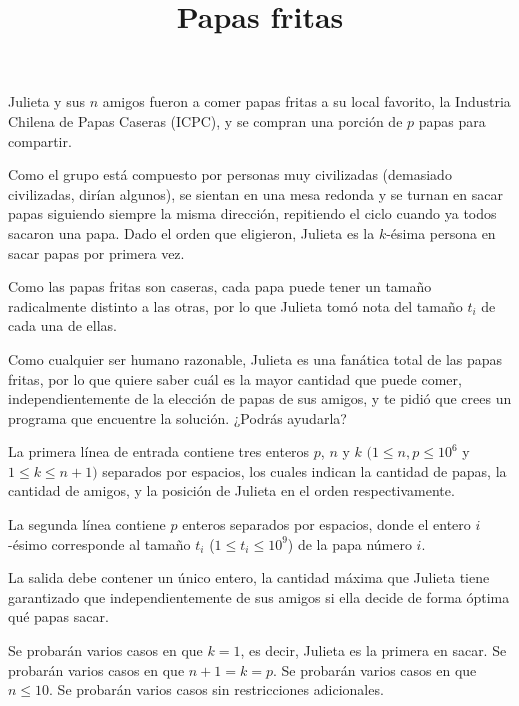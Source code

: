 \documentclass{oci}
\title{Papas fritas}
\begin{document}
\begin{problemDescription}
	Julieta y sus $n$ amigos fueron a comer papas fritas a su local favorito, la Industria Chilena de Papas Caseras (ICPC), y se compran una porción de $p$ papas para compartir.


	Como el grupo está compuesto por personas muy civilizadas (demasiado civilizadas, dirían algunos), se sientan en una mesa redonda y se turnan en sacar papas siguiendo siempre la misma dirección, repitiendo el ciclo cuando ya todos sacaron una papa. Dado el orden que eligieron, Julieta es la $k$-ésima persona en sacar papas por primera vez.

	Como las papas fritas son caseras, cada papa puede tener un tamaño radicalmente distinto a las otras, por lo que Julieta tomó nota del tamaño $t_i$ de cada una de ellas.

	Como cualquier ser humano razonable, Julieta es una fanática total de las papas fritas, por lo que quiere saber cuál es la mayor cantidad que puede comer, independientemente de la elección de papas de sus amigos, y te pidió que crees un programa que encuentre la solución. ¿Podrás ayudarla?
\end{problemDescription}

\begin{inputDescription}
	La primera línea de entrada contiene tres enteros $p$, $n$ y $k$ $(1 \leq n, p \leq 10^6$ y $1 \leq k \leq n+1)$ separados por espacios, los cuales indican la cantidad de papas, la cantidad de amigos, y la posición de Julieta en el orden respectivamente.

	La segunda línea contiene $p$ enteros separados por espacios, donde el entero $i$-ésimo corresponde al tamaño $t_i$ ($1 \leq t_i \leq 10^9$) de la papa número $i$.
\end{inputDescription}

\begin{outputDescription}
	La salida debe contener un único entero, la cantidad máxima que Julieta tiene garantizado que independientemente de sus amigos si ella decide de forma óptima qué papas sacar.
\end{outputDescription}

\begin{scoreDescription}
  	Se probarán varios casos en que $k = 1$, es decir, Julieta es la primera en sacar.
 	Se probarán varios casos en que $n+1 = k = p$.
  	Se probarán varios casos en que $n \leq 10$.
	Se probarán varios casos sin restricciones adicionales.
\end{scoreDescription}

\begin{sampleDescription}
\end{sampleDescription}
\end{document}
